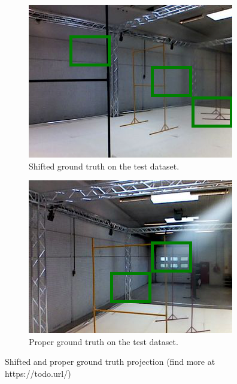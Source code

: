 \begin{figure}[h]
	\centering
	\begin{subfigure}{0.49\textwidth}
		\includegraphics[width=\textwidth]{figure/shifted_gt.png}
		\caption{Shifted ground truth on the test dataset.}
		\label{fig:bad-gt}
	\end{subfigure}
	\begin{subfigure}{0.49\textwidth}
		\includegraphics[width=\textwidth]{figure/good_gt.png}
		\caption{Proper ground truth on the test dataset.}
		\label{fig:good-gt}
	\end{subfigure}
	\caption[Shifted and proper ground truth projection]{Shifted and proper
	ground truth projection (find more at https://todo.url/)}
\end{figure}

